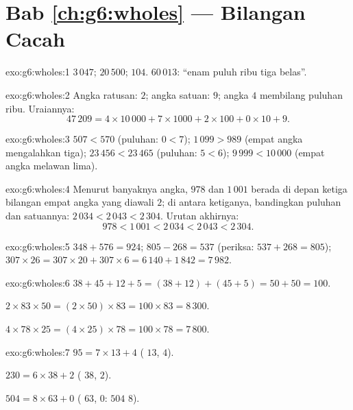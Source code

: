 \section*{Bab \ref{ch:g6:wholes} --- Bilangan Cacah}

\begin{solution}{exo:g6:wholes:1}
$3\,047$; \quad $20\,500$; \quad $104$. \quad
$60\,013$: ``enam puluh ribu tiga belas''.
\end{solution}

\begin{solution}{exo:g6:wholes:2}
Angka ratusan: $2$; angka satuan: $9$; angka $4$ membilang puluhan
ribu. Uraiannya:
\[
47\,209 = 4 \times 10\,000 + 7 \times 1000 + 2 \times 100 + 0 \times 10
+ 9 .
\]
\end{solution}

\begin{solution}{exo:g6:wholes:3}
$507 < 570$ (puluhan: $0 < 7$); \quad
$1\,099 > 989$ (empat angka mengalahkan tiga); \quad
$23\,456 < 23\,465$ (puluhan: $5 < 6$); \quad
$9\,999 < 10\,000$ (empat angka melawan lima).
\end{solution}

\begin{solution}{exo:g6:wholes:4}
Menurut banyaknya angka, $978$ dan $1\,001$ berada di depan ketiga
bilangan empat angka yang diawali $2$; di antara ketiganya,
bandingkan puluhan dan satuannya: $2\,034 < 2\,043 < 2\,304$. Urutan akhirnya:
\[
978 < 1\,001 < 2\,034 < 2\,043 < 2\,304 .
\]
\end{solution}

\begin{solution}{exo:g6:wholes:5}
$348 + 576 = 924$; \quad $805 - 268 = 537$ (periksa:
$537 + 268 = 805$); \quad $307 \times 26 = 307 \times 20 + 307 \times 6
= 6\,140 + 1\,842 = 7\,982$.
\end{solution}

\begin{solution}{exo:g6:wholes:6}
$38 + 45 + 12 + 5 = (38 + 12) + (45 + 5) = 50 + 50 = 100$.

$2 \times 83 \times 50 = (2 \times 50) \times 83 = 100 \times 83 =
8\,300$.

$4 \times 78 \times 25 = (4 \times 25) \times 78 = 100 \times 78 =
7\,800$.
\end{solution}

\begin{solution}{exo:g6:wholes:7}
$95 = 7 \times 13 + 4$ ( $13$,  $4$).

$230 = 6 \times 38 + 2$ ( $38$,  $2$).

$504 = 8 \times 63 + 0$ ( $63$,  $0$: $504$  $8$).
\end{solution}

